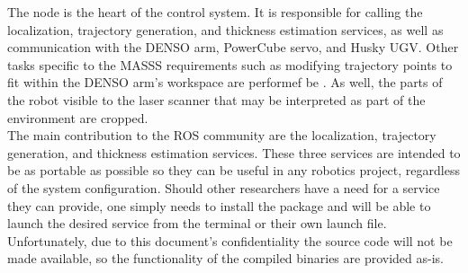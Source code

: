 The  node is the heart of the control system. It is responsible for calling the localization, trajectory generation, and thickness estimation services, as well as communication with the DENSO arm, PowerCube servo, and Husky UGV. Other tasks specific to the MASSS requirements such as modifying trajectory points to fit within the DENSO arm's workspace are performef be . As well, the parts of the robot visible to the laser scanner that may be interpreted as part of the environment are cropped.\\

The main contribution to the ROS community are the localization, trajectory generation, and thickness estimation services. These three services are intended to be as portable as possible so they can be useful in any robotics project, regardless of the system configuration. Should other researchers have a need for a service they can provide, one simply needs to install the package and will be able to launch the desired service from the terminal or their own launch file. Unfortunately, due to this document's confidentiality the source code will not be made available, so the functionality of the compiled binaries are provided as-is.\\


